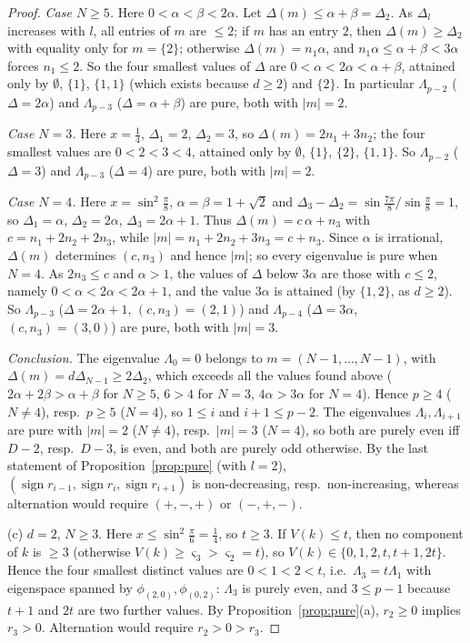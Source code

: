 \documentclass[11pt,a4paper]{article}
\theoremstyle{plain}
\theoremstyle{definition}
\numberwithin{equation}{section}
\begin{document}
\begin{proof}
\emph{Case $N\ge5$.} Here $0<\alpha<\beta<2\alpha$. Let $\Delta(m)\le\alpha+\beta=\Delta_2$. As $\Delta_l$ increases with $l$, all entries of $m$ are $\le2$; if $m$ has an entry $2$, then $\Delta(m)\ge\Delta_2$ with equality only for $m=\{2\}$; otherwise $\Delta(m)=n_1\alpha$, and $n_1\alpha\le\alpha+\beta<3\alpha$ forces $n_1\le2$. So the four smallest values of $\Delta$ are $0<\alpha<2\alpha<\alpha+\beta$, attained only by $\emptyset$, $\{1\}$, $\{1,1\}$ (which exists because $d\ge2$) and $\{2\}$. In particular $\Lambda_{p-2}$ ($\Delta=2\alpha$) and $\Lambda_{p-3}$ ($\Delta=\alpha+\beta$) are pure, both with $|m|=2$.

\emph{Case $N=3$.} Here $x=\frac14$, $\Delta_1=2$, $\Delta_2=3$, so $\Delta(m)=2n_1+3n_2$; the four smallest values are $0<2<3<4$, attained only by $\emptyset$, $\{1\}$, $\{2\}$, $\{1,1\}$. So $\Lambda_{p-2}$ ($\Delta=3$) and $\Lambda_{p-3}$ ($\Delta=4$) are pure, both with $|m|=2$.

\emph{Case $N=4$.} Here $x=\sin^2\frac\pi8$, $\alpha=\beta=1+\sqrt2$ and $\Delta_3-\Delta_2=\sin\frac{7\pi}8/\sin\frac\pi8=1$, so $\Delta_1=\alpha$, $\Delta_2=2\alpha$, $\Delta_3=2\alpha+1$. Thus $\Delta(m)=c\,\alpha+n_3$ with $c=n_1+2n_2+2n_3$, while $|m|=n_1+2n_2+3n_3=c+n_3$. Since $\alpha$ is irrational, $\Delta(m)$ determines $(c,n_3)$ and hence $|m|$; so every eigenvalue is pure when $N=4$. As $2n_3\le c$ and $\alpha>1$, the values of $\Delta$ below $3\alpha$ are those with $c\le2$, namely $0<\alpha<2\alpha<2\alpha+1$, and the value $3\alpha$ is attained (by $\{1,2\}$, as $d\ge2$). So $\Lambda_{p-3}$ ($\Delta=2\alpha+1$, $(c,n_3)=(2,1)$) and $\Lambda_{p-4}$ ($\Delta=3\alpha$, $(c,n_3)=(3,0)$) are pure, both with $|m|=3$.

\emph{Conclusion.} The eigenvalue $\Lambda_0=0$ belongs to $m=(N-1,\dots,N-1)$, with $\Delta(m)=d\Delta_{N-1}\ge2\Delta_2$, which exceeds all the values found above ($2\alpha+2\beta>\alpha+\beta$ for $N\ge5$, $6>4$ for $N=3$, $4\alpha>3\alpha$ for $N=4$). Hence $p\ge4$ ($N\ne4$), resp.\ $p\ge5$ ($N=4$), so $1\le i$ and $i+1\le p-2$. The eigenvalues $\Lambda_i,\Lambda_{i+1}$ are pure with $|m|=2$ ($N\ne4$), resp.\ $|m|=3$ ($N=4$), so both are purely even iff $D-2$, resp.\ $D-3$, is even, and both are purely odd otherwise. By the last statement of Proposition~\ref{prop:pure} (with $l=2$), $(\operatorname{sign}r_{i-1},\operatorname{sign}r_i,\operatorname{sign}r_{i+1})$ is non-decreasing, resp.\ non-increasing, whereas alternation would require $(+,-,+)$ or $(-,+,-)$.

(c) $d=2$, $N\ge3$. Here $x\le\sin^2\frac\pi6=\frac14$, so $t\ge3$. If $V(k)\le t$, then no component of $k$ is $\ge3$ (otherwise $V(k)\ge\varsigma_3>\varsigma_2=t$), so $V(k)\in\{0,1,2,t,t+1,2t\}$. Hence the four smallest distinct values are $0<1<2<t$, i.e.\ $\Lambda_3=t\Lambda_1$ with eigenspace spanned by $\phi_{(2,0)},\phi_{(0,2)}$: $\Lambda_3$ is purely even, and $3\le p-1$ because $t+1$ and $2t$ are two further values. By Proposition~\ref{prop:pure}(a), $r_2\ge0$ implies $r_3>0$. Alternation would require $r_2>0>r_3$.


\end{proof}
\end{document}
